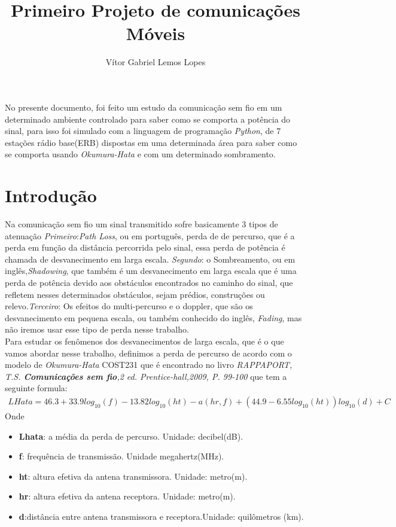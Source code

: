 \documentclass[12pt]{article}
\title{Primeiro Projeto de comunicações Móveis}
\author{Vítor Gabriel Lemos Lopes }
\begin{document}
 
\maketitle


\begin{resumo} 
 No presente documento, foi feito um estudo da comunicação sem fio em um determinado ambiente controlado para saber como se comporta a potência do sinal, para isso foi simulado com a linguagem de programação \textit{Python}, de 7 estações rádio base(ERB) dispostas em uma determinada área para saber como se comporta usando\textit{ Okumura-Hata} e com um determinado sombramento.
\end{resumo}


\section{Introdução}
Na comunicação sem fio um sinal transmitido sofre basicamente 3 tipos de atenuação \textit{Primeiro}:\textit{Path Loss}, ou em português, perda de de percurso, que é a perda em função da distância percorrida pelo sinal, essa perda de potência é chamada de desvanecimento em larga escala. \textit{Segundo}: o Sombreamento, ou em inglês,\textit{Shadowing}, que também é um desvanecimento em larga escala que é uma perda de potência devido aos obstáculos encontrados no caminho do sinal, que refletem nesses determinados obstáculos, sejam prédios, construções ou relevo.\textit{Terceiro}: Os efeitos do multi-percurso e o doppler, que são os desvanecimento em pequena escala, ou também conhecido do inglês, \textit{Fading}, mas não iremos usar esse tipo de perda nesse trabalho.
\\
Para estudar os fenômenos dos desvanecimentos de larga escala, que é o que vamos abordar nesse trabalho, definimos a perda de percurso de acordo com o modelo de \textit{Okumura-Hata} COST231 que é encontrado no livro\textit{ RAPPAPORT, T.S.\textbf{ Comunicações sem fio},2 ed. Prentice-hall,2009, P. 99-100} que tem a seguinte formula:
\begin{eqnarray}
LHata=46.3 +33.9log_{10}(f) - 13.82log_{10}(ht) - a(hr,f)+ (44.9 - 6.55log_{10}(ht))log_{10}(d) + C
\end{eqnarray}
Onde
\begin{itemize}
    \item \textbf{Lhata}: a média da perda de percurso. Unidade: decibel(dB).
    \item \textbf{f}: frequência de transmissão. Unidade megahertz(MHz).
    \item \textbf{ht}: altura efetiva da antena transmissora. Unidade: metro(m).
    \item \textbf{hr}:  altura efetiva da antena receptora. Unidade: metro(m).
    \item \textbf{d}:distância entre antena transmissora e receptora.Unidade: quilômetros (km).
    
\end{itemize}
\end{document}
